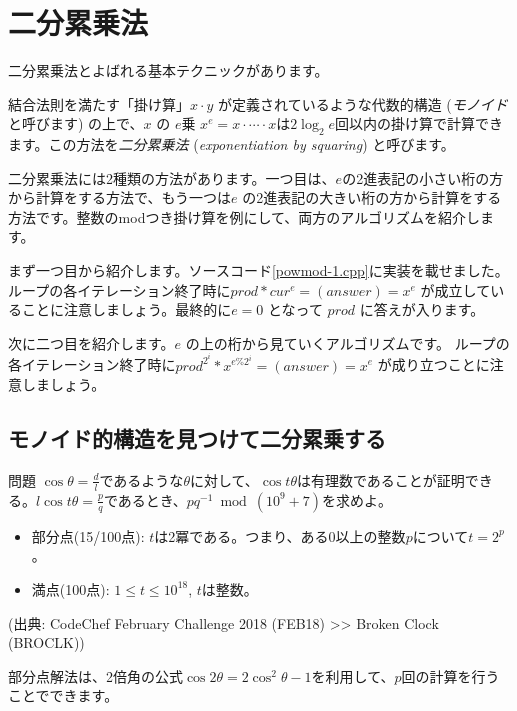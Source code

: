 \documentclass{jsarticle}
\begin{document}
 \section{二分累乗法}
 \label{sec:exponentiation-by-squaring}
 二分累乗法とよばれる基本テクニックがあります。

 結合法則を満たす「掛け算」$x \cdot y$ が定義されているような代数的構造 (\emph{モノイド}と呼びます) の上で、$x$ の $e$乗 $x^e = x \cdot \cdots \cdot x$は$2\log_2 e$回以内の掛け算で計算できます。この方法を\emph{二分累乗法} (\emph{exponentiation by squaring}) と呼びます。

 二分累乗法には2種類の方法があります。一つ目は、$e$の2進表記の小さい桁の方から計算をする方法で、もう一つは$e$ の2進表記の大きい桁の方から計算をする方法です。整数のmodつき掛け算を例にして、両方のアルゴリズムを紹介します。

 まず一つ目から紹介します。ソースコード\ref{powmod-1.cpp}に実装を載せました。
 ループの各イテレーション終了時に$prod * cur^e = (answer) = x^e$ が成立していることに注意しましょう。最終的に$e = 0$ となって $prod$ に答えが入ります。
 

 次に二つ目を紹介します。$e$ の上の桁から見ていくアルゴリズムです。
 ループの各イテレーション終了時に$prod^{2^i} * x^{e \% 2^i} = (answer) = x^e$ が成り立つことに注意しましょう。
 
  \subsection{モノイド的構造を見つけて二分累乗する}
  \begin{itembox}[l]{問題}
   $\cos \theta = \frac{d}{l}$であるような$\theta$に対して、$\cos t\theta$は有理数であることが証明できる。$l\cos t\theta = \frac{p}{q}$であるとき、$pq^{-1} \bmod (10^9+7)$を求めよ。
   \begin{itemize}
    \item 部分点(15/100点): $t$は2冪である。つまり、ある0以上の整数$p$について$t=2^p$。
    \item 満点(100点): $1 \le t \le 10^{18}$, $t$は整数。
   \end{itemize}
   (出典: CodeChef February Challenge 2018 (FEB18) >> Broken Clock (BROCLK))
  \end{itembox}
  部分点解法は、2倍角の公式$\cos 2\theta = 2\cos^2\theta - 1$を利用して、$p$回の計算を行うことでできます。
\end{document}
